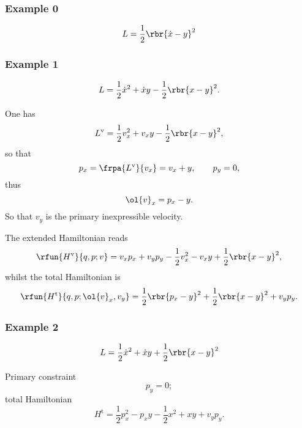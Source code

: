 \documentclass[a4paper,11pt]{article}
\begin{document}
\subsubsection*{Example 0}
\cite[sec.\ 1.2]{Gitman1990}
\begin{equation}
L = \frac{1}{2}\rbr{\dot{x}-y}^2
\end{equation}


\subsubsection*{Example 1}
\begin{equation}
L = \frac{1}{2} \dot{x}^2 + \dot{x} y - \frac{1}{2}\rbr{x-y}^2.
\end{equation}

One has
\begin{equation}
L^\text{v} = \frac{1}{2} v_x^2 + v_x y - \frac{1}{2} \rbr{x-y}^2,
\end{equation}
so that
\begin{equation}
p_x = \frpa{L^\text{v}}{v_x} = v_x + y, \qquad p_y = 0,
\end{equation}
thus
\begin{equation}
\ol{v}_x = p_x - y.
\end{equation}
So that $v_y$ is the primary inexpressible velocity.

The extended Hamiltonian reads
\begin{equation}
\rfun{H^\text{v}}{q, p; v} = v_x p_x + v_y p_y - \frac{1}{2} v_x^2 - v_x y 
+ \frac{1}{2}\rbr{x-y}^2,
\end{equation}
whilst the total Hamiltonian is
\begin{equation}
\rfun{H^\text{t}}{q, p; \ol{v}_x, v_y} = \frac{1}{2}\rbr{p_x - y}^2 + 
\frac{1}{2} \rbr{x-y}^2 + v_y p_y.
\end{equation}

\subsubsection*{Example 2}

\begin{equation}
L = \frac{1}{2}\dot{x}^2 + \dot{x} y + \frac{1}{2}\rbr{x-y}^2
\end{equation}

Primary constraint
\begin{equation}
p_y = 0;
\end{equation}
total Hamiltonian
\begin{equation}
H^\text{t} = \frac{1}{2}p_x^2 - p_x y - \frac{1}{2} x^2 + xy + v_y p_y.
\end{equation}
\end{document}
